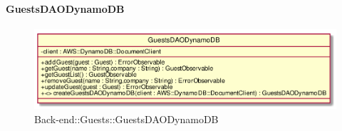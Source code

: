 \hypertarget{GuestsDAODynamoDB_label}{\paragraph{GuestsDAODynamoDB}}
\begin{figure}[h]
	\centering
	\includegraphics[width=\textwidth,height=\textheight,keepaspectratio]{images/ClassGuestsDAODynamoDB.png}
	\caption{Back-end::Guests::GuestsDAODynamoDB}
\end{figure}
